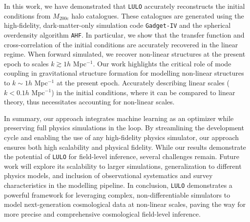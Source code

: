 In this work, we have demonstrated that \texttt{LULO} accurately reconstructs the initial conditions from $M_{200\mathrm{c}}$ halo catalogues. These catalogues are generated using the high-fidelity, dark-matter-only simulation code \texttt{Gadget-IV} and the spherical overdensity algorithm \texttt{AHF}. In particular, we show that the transfer function and cross-correlation of the initial conditions are accurately recovered in the linear regime. When forward simulated, we recover non-linear structures at the present epoch to scales $k\gtrsim1h$ Mpc$^{-1}$. Our work highlights the critical role of mode coupling in gravitational structure formation for modelling non-linear structures to $k\sim1h$ Mpc$^{-1}$ at the present epoch. Accurately describing linear scales ($k < 0.1h$ Mpc$^{-1}$) in the initial conditions, where it can be compared to linear theory, thus necessitates accounting for non-linear scales.

In summary, our approach integrates machine learning as an optimizer while preserving full physics simulations in the loop. By streamlining the development cycle and enabling the use of any high-fidelity physics simulator, our approach ensures both high scalability and physical fidelity. While our results demonstrate the potential of \texttt{LULO} for field-level inference, several challenges remain. Future work will explore its scalability to larger simulations, generalization to different physics models, and inclusion of observational systematics and survey characteristics in the modelling pipeline. In conclusion, \texttt{LULO} demonstrates a powerful framework for leveraging complex, non-differentiable simulators to model next-generation cosmological data at non-linear scales, paving the way for more precise and comprehensive cosmological field-level inference.
